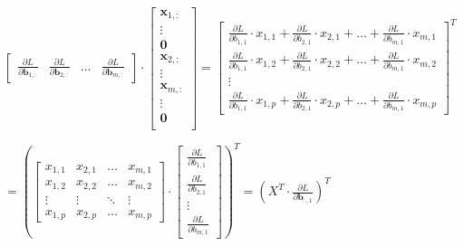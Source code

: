 \documentclass{article}
\begin{document}
\begin{center}
    $\begin{bmatrix}
        \frac{\partial L}{\partial \mathbf{b}_{1,:}} & \frac{\partial L}{\partial \mathbf{b}_{2,:}} & \hdots & \frac{\partial L}{\partial \mathbf{b}_{m,:}}
    \end{bmatrix} \cdot
    \begin{bmatrix}
     \mathbf{x}_{1,:}  \\
       \vdots\\
    \textbf{0} \\
     \mathbf{x}_{2,:} \\
      \vdots\\
     \mathbf{x}_{m,:} \\
    \vdots\\
    \textbf{0} \\
\end{bmatrix}  = \begin{bmatrix}
 \frac{\partial L}{\partial b_{1,1}} \cdot x_{1,1} + \frac{\partial L}{\partial b_{2,1}} \cdot x_{2,1} + \hdots + \frac{\partial L}{\partial b_{m,1}} \cdot x_{m,1} \\
 \frac{\partial L}{\partial b_{1,1}} \cdot x_{1,2} + \frac{\partial L}{\partial b_{2,1}} \cdot x_{2,2} + \hdots + \frac{\partial L}{\partial b_{m,1}} \cdot x_{m,2} \\
 \vdots\\
 \frac{\partial L}{\partial b_{1,1}} \cdot x_{1,p} + \frac{\partial L}{\partial b_{2,1}} \cdot x_{2,p} + \hdots + \frac{\partial L}{\partial b_{m,1}} \cdot x_{m,p} 
\end{bmatrix}^T$
\end{center}
\begin{center}
    $= (\begin{bmatrix}
  x_{1,1} &  x_{2,1} & \hdots &  x_{m,1} \\
  x_{1,2} &  x_{2,2} & \hdots &  x_{m,2} \\
 \vdots &\vdots& \ddots &\vdots\\
  x_{1,p} &  x_{2,p} & \hdots &  x_{m,p} 
\end{bmatrix} \cdot \begin{bmatrix}
 \frac{\partial L}{\partial b_{1,1}} \\ \frac{\partial L}{\partial b_{2,1}} \\ \vdots \\ \frac{\partial L}{\partial b_{m,1}}
\end{bmatrix})^T = (X^T \cdot \frac{\partial L}{\partial \mathbf{b}_{:,1}})^T$
\end{center}
\end{document}

